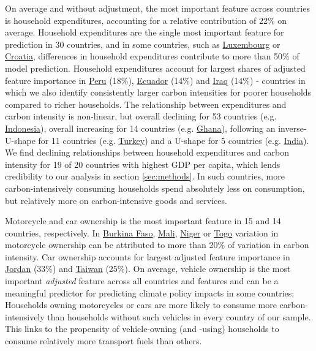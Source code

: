 \documentclass[12pt, a4paper]{article}
\begin{document}
On average and without adjustment, the most important feature across countries is household expenditures, accounting for a relative contribution of 22\% on average. Household expenditures are the single most important feature for prediction in 30 countries, and in some countries, such as \hyperref[fig:5b_LUX]{Luxembourg} or \hyperref[fig:5b_HRV]{Croatia}, differences in household expenditures contribute to more than 50\% of model prediction. Household expenditures account for largest shares of adjusted feature importance in \hyperref[fig:5b_PER]{Peru} (18\%), \hyperref[fig:5b_ECU]{Ecuador} (14\%) and \hyperref[fig:5b_IRQ]{Iraq} (14\%) - countries in which we also identify consistently larger carbon intensities for poorer households compared to richer households. The relationship between expenditures and carbon intensity is non-linear, but overall declining for 53 countries (e.g. \hyperref[fig:5b_EST]{Indonesia}), overall increasing for 14 countries (e.g. \hyperref[fig:5b_GHA]{Ghana}), following an inverse-U-shape for 11 countries (e.g. \hyperref[fig:5b_TUR]{Turkey}) and a U-shape for 5 countries (e.g. \hyperref[fig:5b_IND]{India}). We find declining relationships between household expenditures and carbon intensity for 19 of 20 countries with highest GDP per capita, which lends credibility to our analysis in section \ref{sec:methods}. In such countries, more carbon-intensively consuming households spend absolutely less on consumption, but relatively more on carbon-intensive goods and services.

Motorcycle and car ownership is the most important feature in 15 and 14 countries, respectively. In \hyperref[fig:5b_BFA]{Burkina Faso}, \hyperref[fig:5b_MLI]{Mali}, \hyperref[fig:5b_NER]{Niger} or \hyperref[fig:5b_TGO]{Togo} variation in motorcycle ownership can be attributed to more than 20\% of variation in carbon intensity. Car ownership accounts for largest adjusted feature importance in \hyperref[fig:5b_JOR]{Jordan} (33\%) and \hyperref[fig:5b_TWN]{Taiwan} (25\%). On average, vehicle ownership is the most important \textit{adjusted} feature across all countries and features and can be a meaningful predictor for predicting climate policy impacts in some countries: Households owning motorcycles or cars are more likely to consume more carbon-intensively than households without such vehicles in every country of our sample. This links to the propensity of vehicle-owning (and -using) households to consume relatively more transport fuels than others.
\end{document}
